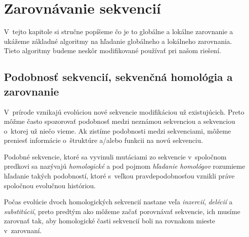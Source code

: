 \chapter{Zarovnávanie sekvencií}
\label{chap:alignment}

V~tejto kapitole si stručne popíšeme čo je to globálne a lokálne zarovnanie a ukážeme základné algoritmy na hľadanie globálneho a lokálneho zarovnania. Tieto algoritmy budeme neskôr modifikované používať pri našom riešení.

\section{Podobnosť sekvencií, sekvenčná homológia a zarovnanie}
V~prírode vznikajú evolúciou nové sekvencie modifikáciou už existujúcich. Preto môžme často spozorovať podobnosť medzi neznámou sekvenciou a sekvenciou o~ktorej už niečo vieme. Ak zistíme podobnosti medzi sekvenciami, môžeme preniesť informácie o~štruktúre a/alebo funkcii na novú sekvenciu.

Podobné sekvencie, ktoré sa vyvinuli mutáciami zo sekvencie v~spoločnom predkovi sa nazývajú \textit{homologické} a pod pojmom \textit{hľadanie homológov} rozumieme hľadanie takých podobností, ktoré s~veľkou pravdepodobnosťou vznikli práve spoločnou evolučnou históriou.



Počas evolúcie dvoch homologických sekvencií nastane veľa \textit{inzercií}, \textit{delécií} a \textit{substitúcií}, preto predtým ako môžeme začať porovnávať sekvencie, ich musíme zarovnať tak, aby homologické časti sekvencií boli na rovnakom mieste v~zarovnaní.
\cite{durbin, skripta}

